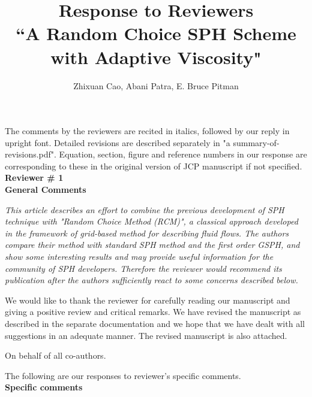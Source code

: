 \documentclass[10pt,a4paper]{article}
\begin{document}
\author{\Large {Zhixuan Cao, Abani Patra, E. Bruce Pitman}}

\title{
\LARGE \textbf{Response to Reviewers} \\
\Large \textbf{``A Random Choice SPH Scheme with Adaptive Viscosity"}}

\date{\vspace{-5ex}}

\maketitle
The comments by the reviewers are recited in italics, followed by our reply in upright font. Detailed revisions are described separately in "a summary-of-revisions.pdf". Equation, section, figure and reference numbers in our response are corresponding to these in the original 
version of JCP manuscript if not specified. \\[12pt]

\textbf{\Large Reviewer \# 1}\\[3pt]

\textbf{\large General Comments}

\textit{This article describes an effort to combine the previous development of SPH technique with "Random Choice Method (RCM)", a classical approach developed in the framework of grid-based method for
describing fluid flows. The authors compare their method with standard SPH method and the first order GSPH, and show some interesting results and may provide useful information for the community of SPH developers. Therefore the reviewer would recommend its publication after the authors sufficiently react to some concerns described below.} 

We would like to thank the reviewer for carefully reading our manuscript and giving a positive review and critical remarks.
We have revised the manuscript as described in the separate documentation and we hope that we have dealt with all suggestions in an adequate manner. The revised manuscript is also attached.
 
On behalf of all co-authors.

The following are our responses to reviewer's specific comments.\\[12pt]

\textbf{\large Specific comments}
\end{document}
